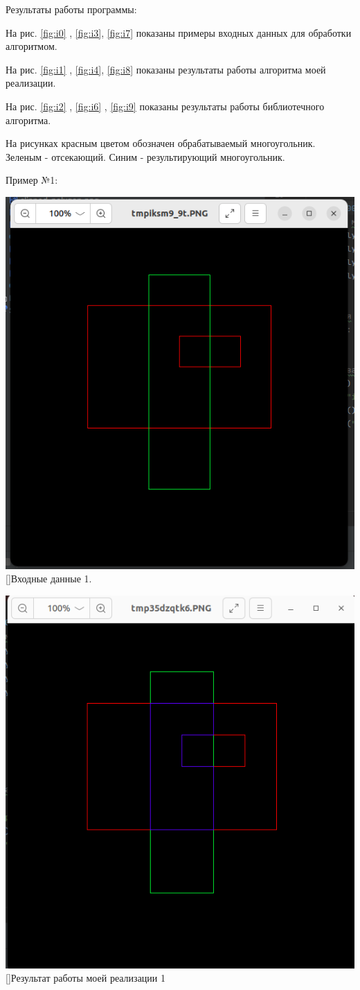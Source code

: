 \documentclass[12pt]{article}
\begin{document}
Результаты работы программы:

На рис. \ref{fig:i0} ,  \ref{fig:i3}, \ref{fig:i7} показаны примеры входных данных для обработки алгоритмом.

На рис. \ref{fig:i1} , \ref{fig:i4}, \ref{fig:i8} показаны результаты работы алгоритма моей реализации.

На рис. \ref{fig:i2} ,  \ref{fig:i6} , \ref{fig:i9} показаны результаты работы библиотечного алгоритма. 



На рисунках красным цветом обозначен обрабатываемый многоугольник. Зеленым - отсекающий. Синим - результирующий многоугольник.

Пример №1:

\vskip 1cm
{
    \centering
    \includegraphics[width=0.5\linewidth]{вход1.png}
    []{Входные данные 1.}
    \label{fig:i0}
}
\vskip 1cm


\vskip 1cm
{
    \centering
    \includegraphics[width=0.5\linewidth]{резмой1.png}
    []{Результат работы моей реализации 1}
    \label{fig:i1}
}
\vskip 1cm
\end{document}
